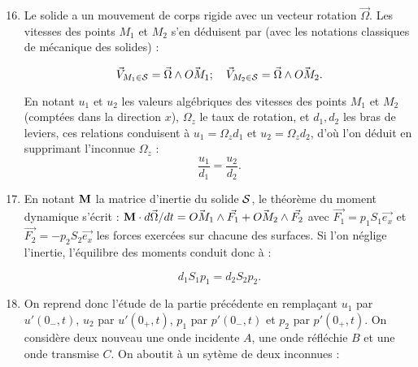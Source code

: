 \documentclass[10pt, a4paper]{article}
\newcommand{\question}[1]{}
\newcommand{\answer}[1]{#1}
\begin{document}
\begin{enumerate}
 \setcounter{enumi}{15}
\item 
\question{Donnez la relation cinématique entre $u_1$ et $u_2$ (vitesses au niveau du tympan et de la fenêtre ovale).}

\answer{
Le solide a un mouvement de corps rigide avec un vecteur rotation $\vec {\Omega}$. Les vitesses des points $M_1$ et $M_2$ s'en déduisent par (avec les notations classiques de mécanique des solides) : 

$$
\vec{V}_{M_1 \in {\cal S}} = \vec{\Omega} \wedge \vec{OM_1} ; \quad \vec{V}_{M_2 \in {\cal S}} = \vec{\Omega} \wedge \vec{OM_2}.
$$

En notant $u_1$ et $u_2$ les valeurs algébriques des vitesses des points $M_1$ et $M_2$ (comptées dans la direction $x$), $\Omega_z$ le taux de rotation, et $d_1,d_2$ les bras de leviers, ces relations conduisent à $u_1 = \Omega_z d_1$ et $u_2 = \Omega_z d_2$, d'où l'on déduit en supprimant l'inconnue $\Omega_z$ :
\begin{equation}
\frac{u_1}{d_1} = \frac{u_2}{d_2}.
\end{equation}
}

\item 
\question{ \underline{ En négligeant l'inertie des osselets}, donnez une relation entre les forces $F_1$ et $F_2$  puis entre les pressions $p'_1$ et $p'_2$.}

\answer{
En notant $\bf{M}$ la matrice d'inertie du solide $\cal S$, le théorème du moment dynamique s'écrit : ${\bf M} \cdot d \vec{\Omega}/dt = \vec{OM_1} \wedge \vec{F_1} + \vec{OM_2} \wedge \vec{F_2}$ avec $\vec{F_1} = p_1 S_1 \vec{e_x}$ et $\vec{F_2} = -p_2 S_2 \vec{e_x}$ les forces exercées sur chacune des surfaces.
Si l'on néglige l'inertie, l'équilibre des moments conduit donc à :

\begin{equation}
d_1 S_1 p_1  = d_2 S_2 p_2.
\end{equation}
}



\item 
\question{Reprendre l'étude de la partie précédente, et donnez une expression du coefficient 
de transmission.

Comparez avec les résultats des questions 10 et 11.


Pour en savoir plus :
\verb| http://www.cochlea.eu/oreille-generalites/oreille-moyenne |

}

\answer{
On reprend donc l'étude de la partie précédente en remplaçant $u_1$ par $u'(0_-,t)$, $u_2$ par $u'(0_+,t)$, $p_1$ par $p'(0_-,t)$ et $p_2$ par $p'(0_+,t)$. On considère deux nouveau une onde incidente $A$, une onde réfléchie $B$ et une onde transmise $C$. 
On aboutit à un sytème de deux inconnues :  

}
\end{enumerate}
\end{document}
